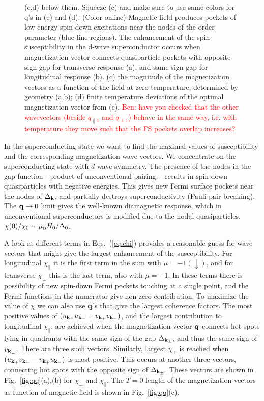 \documentclass[aps,prl,twocolumn,showpacs,amsmath,amssymb]{revtex4-1}
\newcommand{\red}{\textcolor{red}}
\begin{document}
\begin{figure}[t]
{{	(c,d) below them. Squeeze (c) and make sure to use same colors for q's in (c) and (d). } 
	(Color online) 
	Magnetic field produces pockets of low energy spin-down excitations near the nodes 
	of the order parameter (blue line regions). 
	The enhancement of the spin susceptibility in the d-wave superconductor occurs 
	when magnetization vector connects quasiparticle pockets with opposite sign gap 
	for transverse response (a), and same sign gap for longitudinal response (b). 
	(c) the magnitude of the magnetization vectors as a function of the field at zero 
	temperature, determined by geometry (a,b); 
	(d) finite temperature deviations of the optimal magnetization vector from (c). 
	\red{Ben: have you checked that the other wavevectors (beside $q_{\parallel 1}$ and $q_{\perp 1}$) 
	behave in the same way, i.e. with temperature they move such that the FS pockets overlap increases?} 
} 
\end{figure}

In the superconducting state we want to find the maximal values of susceptibility and the corresponding 
magnetization wave vectors. We concentrate on the superconducting state with $d$-wave symmetry. 
The presence of the nodes in the gap function - product of unconventional pairing, -  results in 
spin-down quasiparticles with negative energies. This gives new Fermi surface pockets near the nodes 
of $\Delta_{\bf k}$, and partially destroys superconductivity (Pauli pair breaking). 
The ${\bf q} \to 0$ limit gives the well-known diamagnetic response, which in unconventional superconductors 
is modified due to the nodal quasiparticles, $\chi(0)/\chi_0 \sim \mu_{\mbox{\tiny B}} H_0/\Delta_0$.  

A look at different terms in Eqs.~(\ref{eq:chi}) provides a reasonable guess for 
wave vectors that 
might give the largest enhancement of the susceptibility. 
For longitudinal $\chi_\parallel$ it is the first term in the sum with $\mu=-1 (\downarrow)$, 
and for transverse $\chi_\perp$ this is the last term, also with $\mu=-1$. 
In these terms there is possibility of new spin-down Fermi pockets touching at a single point, 
and the Fermi functions in the numerator give non-zero contribution. 
To maximize the value of $\chi$ we can also use ${\bf q}$'s that give the largest coherence 
factors. 
The most positive values of $ ( u_{{\bf k}_+}u_{{\bf k}_-}+v_{{\bf k}_+}v_{{\bf k}_-} ) $, 
and the largest contribution to longitudinal $\chi_\parallel$,  
are achieved when the magnetization vector ${\bf q}$ connects 
hot spots lying in quadrants with the same sign of the gap $\Delta_{{\bf k}_\pm}$, 
and thus the same sign of $v_{{\bf k}_\pm}$. There are three such vectors. 
Similarly, largest $\chi_\perp$ is reached when $ ( u_{{\bf k}_+}v_{{\bf k}_-}-v_{{\bf k}_+}u_{{\bf k}_-} ) $
is most positive. This occurs at another three vectors, connecting hot spots with the 
opposite sign of $\Delta_{{\bf k}_\pm}$. 
These vectors are shown in Fig.~\ref{fig:qq}(a),(b) for $\chi_\perp$ and $\chi_\parallel$. 
The $T=0$ length of the magnetization vectors as function of magnetic field 
is shown in Fig.~\ref{fig:qq}(c).
\end{document}
